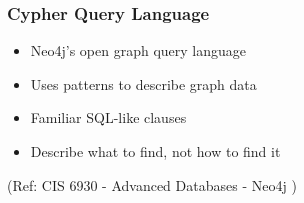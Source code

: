 \begin{frame}\frametitle{Cypher Query Language}

\begin{itemize}
\item Neo4j’s open graph query language
\item Uses patterns to describe graph data
\item Familiar SQL-like clauses
\item Describe what to find, not how to find it
\end{itemize}

{\tiny (Ref: CIS 6930 - Advanced Databases - Neo4j )}
\end{frame}
